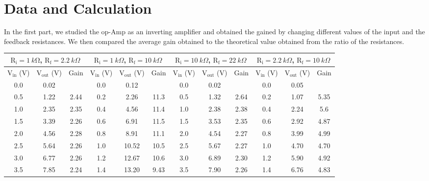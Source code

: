 \documentclass{scrartcl}
\begin{document}
\section{Data and Calculation}
In the first part, we studied the op-Amp as an inverting amplifier and obtained the gained by changing different values of the input and the feedback resistances. We then compared the average gain obtained to the theoretical value obtained from the ratio of the resistances.
\begin{table}[H]
    \centering
    \small %
    \begin{tabular}{|c|c|c|c|c|c|c|c|c|c|c|c|}
    \hline
    \multicolumn{3}{|c|}{$\mathrm{R_i} = \SI{1}{k\ohm}$, $\mathrm{R_f} = \SI{2.2}{k\Omega}$} & 
    \multicolumn{3}{c|}{$\mathrm{R_i} = \SI{1}{k\Omega}$, $\mathrm{R_f} = \SI{10}{k\Omega}$} & 
    \multicolumn{3}{c|}{$\mathrm{R_i} = \SI{10}{k\Omega}$, $\mathrm{R_f} = \SI{22}{k\Omega}$} & 
    \multicolumn{3}{c|}{$\mathrm{R_i} = \SI{2.2}{k\Omega}$, $\mathrm{R_f} = \SI{10}{k\Omega}$} \\ \hline
    {$\mathrm{V_{\text{in}}}$ (V)} & {$\mathrm{V_{\text{out}}}$ (V)} & {Gain} & 
    {$\mathrm{V_{\text{in}}}$ (V)} & {$\mathrm{V_{\text{out}}}$ (V)} & {Gain} & 
    {$\mathrm{V_{\text{in}}}$ (V)} & {$\mathrm{V_{\text{out}}}$ (V)} & {Gain} & 
    {$\mathrm{V_{\text{in}}}$ (V)} & {$\mathrm{V_{\text{out}}}$ (V)} & {Gain} \\ \hline
    0.0    & 0.02  & \textemdash{} & 0.0    & 0.12  & \textemdash{} & 0.0    & 0.02  & \textemdash{} & 0.0    & 0.05  & \textemdash{} \\ \hline
    0.5  & 1.22  & 2.44  & 0.2  & 2.26  & 11.3  & 0.5  & 1.32  & 2.64  & 0.2  & 1.07  & 5.35  \\ \hline
    1.0    & 2.35  & 2.35  & 0.4  & 4.56  & 11.4  & 1.0    & 2.38  & 2.38  & 0.4  & 2.24  & 5.6   \\ \hline
    1.5  & 3.39  & 2.26  & 0.6  & 6.91  & 11.5  & 1.5  & 3.53  & 2.35  & 0.6  & 2.92  & 4.87  \\ \hline
    2.0   & 4.56  & 2.28  & 0.8  & 8.91  & 11.1  & 2.0    & 4.54  & 2.27  & 0.8  & 3.99  & 4.99  \\ \hline
    2.5  & 5.64  & 2.26  & 1.0  & 10.52 & 10.5  & 2.5  & 5.67  & 2.27  & 1.0  & 4.70  & 4.70  \\ \hline
    3.0    & 6.77  & 2.26  & 1.2  & 12.67 & 10.6  & 3.0  & 6.89  & 2.30  & 1.2  & 5.90  & 4.92  \\ \hline
    3.5  & 7.85  & 2.24  & 1.4  & 13.20 & 9.43  & 3.5  & 7.90  & 2.26  & 1.4  & 6.76  & 4.83  \\ \hline

\end{tabular}
\end{table}
\end{document}
